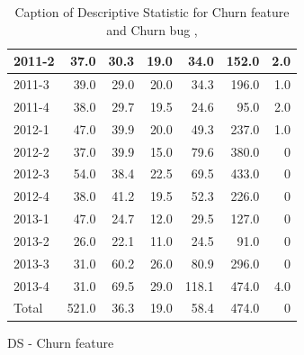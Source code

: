 \documentclass[UKenglish]{ifimaster}  %
\begin{document}
\begin{appendices}
\begin{table}[!htbp]
\begin{adjustwidth}{-1.5cm}{}
\begin{subfigure}[b]{0.3\textwidth}
{\begin{tabular}{ | l | r | r | r | r | r | r | }
2011-2 & 37.0 & 30.3 & 19.0 & 34.0 & 152.0 & 2.0\\ \hline
2011-3 & 39.0 & 29.0 & 20.0 & 34.3 & 196.0 & 1.0\\ \hline
2011-4 & 38.0 & 29.7 & 19.5 & 24.6 & 95.0 & 2.0\\ \hline
2012-1 & 47.0 & 39.9 & 20.0 & 49.3 & 237.0 & 1.0\\ \hline
2012-2 & 37.0 & 39.9 & 15.0 & 79.6 & 380.0 & 0\\ \hline
2012-3 & 54.0 & 38.4 & 22.5 & 69.5 & 433.0 & 0\\ \hline
2012-4 & 38.0 & 41.2 & 19.5 & 52.3 & 226.0 & 0\\ \hline
2013-1 & 47.0 & 24.7 & 12.0 & 29.5 & 127.0 & 0\\ \hline
2013-2 & 26.0 & 22.1 & 11.0 & 24.5 & 91.0 & 0\\ \hline
2013-3 & 31.0 & 60.2 & 26.0 & 80.9 & 296.0 & 0\\ \hline
2013-4 & 31.0 & 69.5 & 29.0 & 118.1 & 474.0 & 4.0\\ \hline
Total & 521.0 & 36.3 & 19.0 & 58.4 & 474.0 & 0\\ \hline
\end{tabular}
}
\caption{DS - Churn feature}
 \label{DS:CB:2}
\end{subfigure}
\end{adjustwidth}
\caption[Optional caption for list of figures]{Caption of Descriptive Statistic for Churn feature and Churn bug , }
\label{DS:2:4}
\end{table}






\end{appendices}
\end{document}
